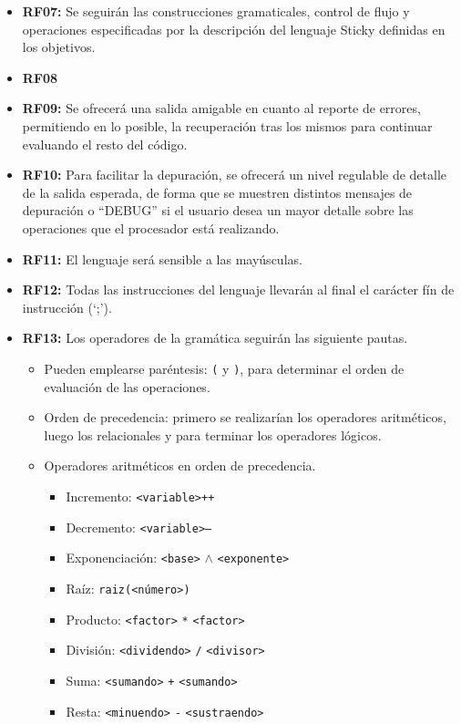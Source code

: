       \begin{itemize}
      \item \textbf{RF07:} Se seguirán las construcciones gramaticales, control de flujo y operaciones especificadas por la descripción del lenguaje Sticky definidas en los objetivos.
      \item \textbf{RF08}
      \item \textbf{RF09:} Se ofrecerá una salida amigable en cuanto al reporte de errores, permitiendo en lo posible, la recuperación tras los mismos para continuar evaluando el resto del código.
      \item \textbf{RF10:} Para facilitar la depuración, se ofrecerá un nivel regulable de detalle de la salida esperada, de forma que se muestren distintos mensajes de depuración o ``DEBUG'' si el usuario desea un mayor detalle sobre las operaciones que el procesador está realizando.
      \item \textbf{RF11:} El lenguaje será sensible a las mayúsculas.
      \item \textbf{RF12:} Todas las instrucciones del lenguaje llevarán al final el carácter fín de instrucción (`;').
      \item \textbf{RF13:} Los operadores de la gramática seguirán las siguiente pautas.
        
        \begin{itemize}
        \item Pueden emplearse paréntesis: \texttt{(} y  \texttt{)}, para determinar el orden de evaluación de las operaciones.
        \item Orden de precedencia: primero se realizarían los operadores aritméticos, luego los relacionales y para terminar los operadores lógicos.
        \item Operadores aritméticos en orden de precedencia.
          
          \begin{itemize}
          \item Incremento: \texttt{<variable>++}
          \item Decremento:  \texttt{<variable>--}
          \item Exponenciación: \texttt{<base>} \texttt{\ensuremath{\wedge}} \texttt{<exponente>}
          \item Raíz: \texttt{raiz(<número>)}
          \item Producto: \texttt{<factor>} \texttt{*} \texttt{<factor>}
          \item División: \texttt{<dividendo>} \texttt{/} \texttt{<divisor>}
          \item Suma: \texttt{<sumando>} \texttt{+} \texttt{<sumando>}
          \item Resta: \texttt{<minuendo>} \texttt{-} \texttt{<sustraendo>}
          \end{itemize}
          

\end{itemize}
\end{itemize}
